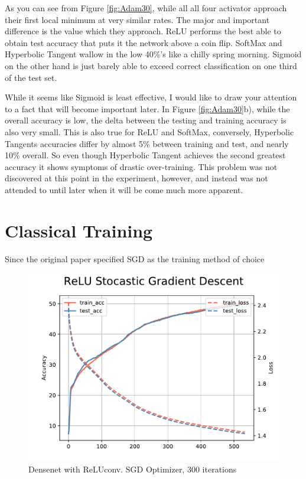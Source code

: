 \documentclass{article}
\begin{document}
As you can see from Figure \ref{fig:Adam30}, while all all four activator approach their first local minimum at very similar rates.
The major and important difference is the value which they approach.
ReLU performs the best able to obtain test accuracy that puts it the network above a coin flip.
SoftMax and Hyperbolic Tangent wallow in the low 40\%'s like a chilly spring morning.
Sigmoid on the other hand is just barely able to exceed correct classification on one third of the test set.

While it seems like Sigmoid is least effective, I would like to draw your attention to a fact that will become important later.
In Figure \ref{fig:Adam30}b), while the overall accuracy is low, the delta between the testing and training accuracy is also very small.
This is also true for ReLU and SoftMax, conversely, Hyperbolic Tangents accuracies differ by almost 5\% between training and test, and nearly 10\% overall.
So even though Hyperbolic Tangent achieves the second greatest accuracy it shows symptoms of drastic over-training.
This problem was not discovered at this point in the experiment, however, and instead was not attended to until later when it will be come much more apparent.

\section{Classical Training}

Since the original paper specified SGD as the training method of choice
\begin{figure}
        \centering
        \includegraphics[width=0.8\linewidth]{figures/SGD3k/relu.pdf}
        \caption{Densenet with ReLUconv. SGD Optimizer, 300 iterations}
        \label{fig:ReLUSGD}
\end{figure}
\end{document}
